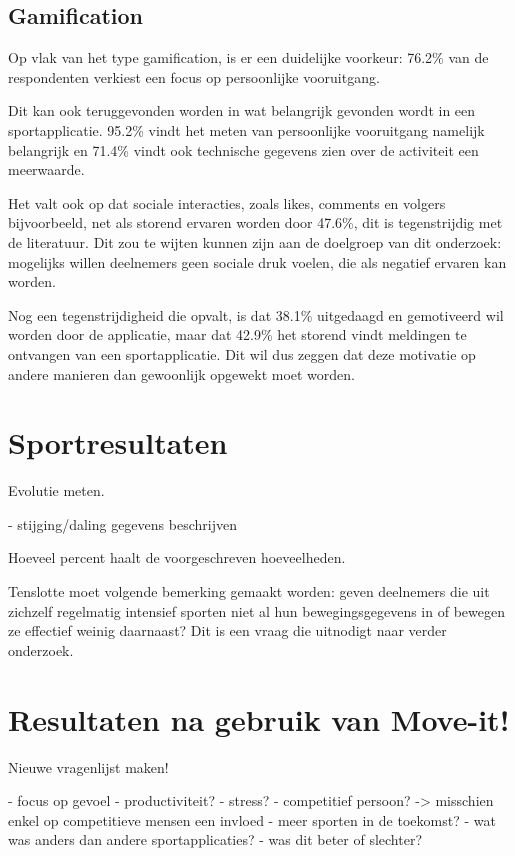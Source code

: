 \subsection{Gamification}

Op vlak van het type gamification, is er een duidelijke voorkeur: 76.2\% van de respondenten verkiest een focus op persoonlijke vooruitgang.

Dit kan ook teruggevonden worden in wat belangrijk gevonden wordt in een sportapplicatie. 95.2\% vindt het meten van persoonlijke vooruitgang namelijk belangrijk en 71.4\% vindt ook technische gegevens zien over de activiteit een meerwaarde.

Het valt ook op dat sociale interacties, zoals likes, comments en volgers bijvoorbeeld, net als storend ervaren worden door 47.6\%, dit is tegenstrijdig met de literatuur. Dit zou te wijten kunnen zijn aan de doelgroep van dit onderzoek: mogelijks willen deelnemers geen sociale druk voelen, die als negatief ervaren kan worden.

Nog een tegenstrijdigheid die opvalt, is dat 38.1\% uitgedaagd en gemotiveerd wil worden door de applicatie, maar dat 42.9\% het storend vindt meldingen te ontvangen van een sportapplicatie. Dit wil dus zeggen dat deze motivatie op andere manieren dan gewoonlijk opgewekt moet worden.

\section{Sportresultaten}

Evolutie meten.

- stijging/daling gegevens beschrijven

Hoeveel percent haalt de voorgeschreven hoeveelheden.

Tenslotte moet volgende bemerking gemaakt worden: geven deelnemers die uit zichzelf regelmatig intensief sporten niet al hun bewegingsgegevens in of bewegen ze effectief weinig daarnaast? Dit is een vraag die uitnodigt naar verder onderzoek.

\section{Resultaten na gebruik van Move-it!}

Nieuwe vragenlijst maken!

- focus op gevoel
- productiviteit?
- stress?
- competitief persoon? -> misschien enkel op competitieve mensen een invloed
- meer sporten in de toekomst?
- wat was anders dan andere sportapplicaties?
    - was dit beter of slechter?
